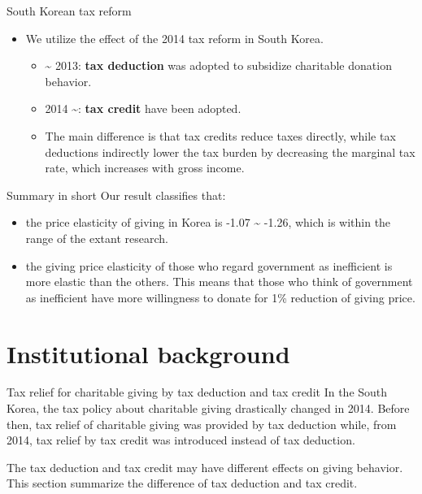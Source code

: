 \documentclass[
  ignorenonframetext,
]{beamer}
\providecommand{\tightlist}{%
  \setlength{\itemsep}{0pt}\setlength{\parskip}{0pt}}
\begin{document}
\begin{frame}{South Korean tax reform}
\protect\hypertarget{south-korean-tax-reform}{}
\begin{itemize}
\tightlist
\item
  We utilize the effect of the 2014 tax reform in South Korea.

  \begin{itemize}
  \tightlist
  \item
    \textasciitilde{} 2013: \textbf{tax deduction} was adopted to subsidize charitable donation behavior.
  \item
    2014 \textasciitilde: \textbf{tax credit} have been adopted.
  \item
    The main difference is that tax credits reduce taxes directly, while tax deductions indirectly lower the tax burden by decreasing the marginal tax rate, which increases with gross income.
  \end{itemize}
\end{itemize}
\end{frame}

\begin{frame}{Summary in short}
\protect\hypertarget{summary-in-short}{}
Our result classifies that:

\begin{itemize}
\tightlist
\item
  the price elasticity of giving in Korea is -1.07 \textasciitilde{} -1.26, which is within the range of the extant research.
\item
  the giving price elasticity of those who regard government as inefficient is more elastic than the others. This means that those who think of government as inefficient have more willingness to donate for 1\% reduction of giving price.
\end{itemize}
\end{frame}

\hypertarget{institutional-background}{%
\section{Institutional background}\label{institutional-background}}

\begin{frame}{Tax relief for charitable giving by tax deduction and tax credit}
\protect\hypertarget{tax-relief-for-charitable-giving-by-tax-deduction-and-tax-credit}{}
In the South Korea, the tax policy about charitable giving drastically changed in 2014. Before then, tax relief of charitable giving was provided by tax deduction while, from 2014, tax relief by tax credit was introduced instead of tax deduction.

The tax deduction and tax credit may have different effects on giving behavior.
This section summarize the difference of tax deduction and tax credit.
\end{frame}
\end{document}
